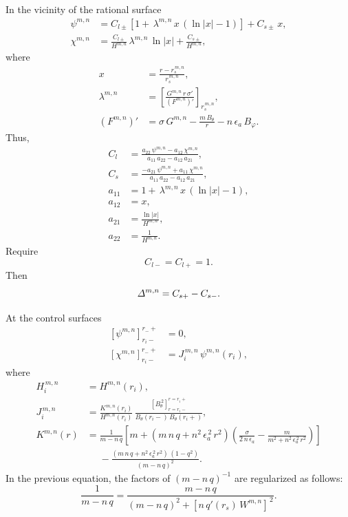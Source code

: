 \documentclass[12pt, oneside]{article}
\begin{document}
In the vicinity of the rational surface
\begin{align}
\psi^{m,n}&= C_{l\pm}\left[1+\,\lambda^{m,n}\,x\,(\ln|x|-1)\right] + C_{s\pm}\,x,\\[0.5ex]
\chi^{m,n} &= \frac{C_{l\pm}}{H^{m,n}}\,\lambda^{m,n}\,\ln|x| + \frac{C_{s\pm}}{H^{m,n}},
\end{align}
where
\begin{align}
x&= \frac{r-r_s^{\,m,n}}{r_s^{\,m,n}},\\[0.5ex]
\lambda^{m,n} &= \left[\frac{G^{m,n}\,r\,\sigma'}{(F^{m,n})'}\right]_{r_s^{\,m,n}},\\[0.5ex]
(F^{m,n})' &= \sigma\,G^{m,n} - \frac{m\,B_\theta}{r} -n\,\epsilon_a\,B_\varphi.
\end{align}
Thus,
\begin{align}
C_l &= \frac{a_{22}\,\psi^{m,n}-a_{12}\,\chi^{m,n}}{a_{11}\,a_{22}-a_{12}\,a_{21}},\\[0.5ex]
C_s &= \frac{-a_{21}\,\psi^{m,n}+a_{11}\,\chi^{m,n}}{a_{11}\,a_{22}-a_{12}\,a_{21}},\\[0.5ex]
a_{11} &= 1+\,\lambda^{m,n}\,x\,(\ln|x|-1),\\[0.5ex]
a_{12}&= x,\\[0.5ex]
a_{21}&= \frac{\ln|x|}{H^{m,n}},\\[0.5ex]
a_{22} &= \frac{1}{H^{m,n}}.
\end{align}
Require
\begin{equation}
C_{l-}=C_{l+} = 1.
\end{equation}
Then
\begin{equation}
{\mit\Delta}^{m,n} = C_{s+}-C_{s-}.
\end{equation}

At the control surfaces
\begin{align}
\left[\psi^{m,n}\right]_{r_i-}^{r_-+} &= 0,\\[0.5ex]
\left[\chi^{m,n}\right]_{r_i-}^{r_-+} &= J_i^{\,m,n}\,\psi^{m,n}(r_i),
\end{align}
where
\begin{align}
H^{\,m,n}_i &= H^{m,n}(r_i),\\[0.5ex]
J_i^{\,m,n} &= \frac{K^{m,n}(r_i)}{H^{m,n}(r_i)}\,\frac{[B_\theta^{\,2}]_{r=r_{i}-}^{r=r_{i}+}}{B_\theta(r_i-)\,B_\theta(r_{i}+)},\\[0.5ex]
K^{m,n}(r) &= \frac{1}{m-n\,q}\left[m+ (m\,n\,q+n^2\,\epsilon_a^{\,2}\,r^2)\left(\frac{\sigma}{2\,n\,\epsilon_a}-\frac{m}{m^2+n^2\,\epsilon_a^{\,2}\,r^2}\right)\right]\nonumber\\[0.5ex]
&\phantom{=}  -\frac{(m\,n\,q+n^2\,\epsilon_a^{\,2}\,r^2)\,(1-q^2)}{(m-n\,q)^2}.
\end{align}
In the previous equation, the factors of $(m-n\,q)^{-1}$ are regularized as follows: 
\begin{equation}
\frac{1}{m-n\,q} = \frac{m-n\,q}{(m-n\,q)^2+ [n\,q'(r_s)\,W^{m,n}]^{\,2}}.
\end{equation}
\end{document}
